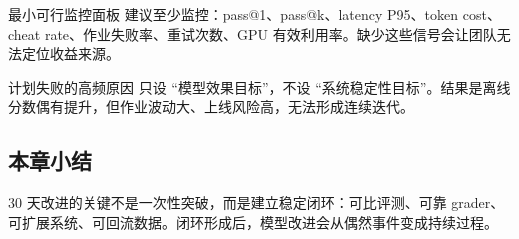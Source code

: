 \begin{knowledgebox}{最小可行监控面板}
建议至少监控：pass@1、pass@k、latency P95、token cost、cheat rate、作业失败率、重试次数、GPU 有效利用率。缺少这些信号会让团队无法定位收益来源。
\end{knowledgebox}

\begin{warningbox}{计划失败的高频原因}
只设 ``模型效果目标''，不设 ``系统稳定性目标''。结果是离线分数偶有提升，但作业波动大、上线风险高，无法形成连续迭代。
\end{warningbox}

\subsection{本章小结}
30 天改进的关键不是一次性突破，而是建立稳定闭环：可比评测、可靠 grader、可扩展系统、可回流数据。闭环形成后，模型改进会从偶然事件变成持续过程。

